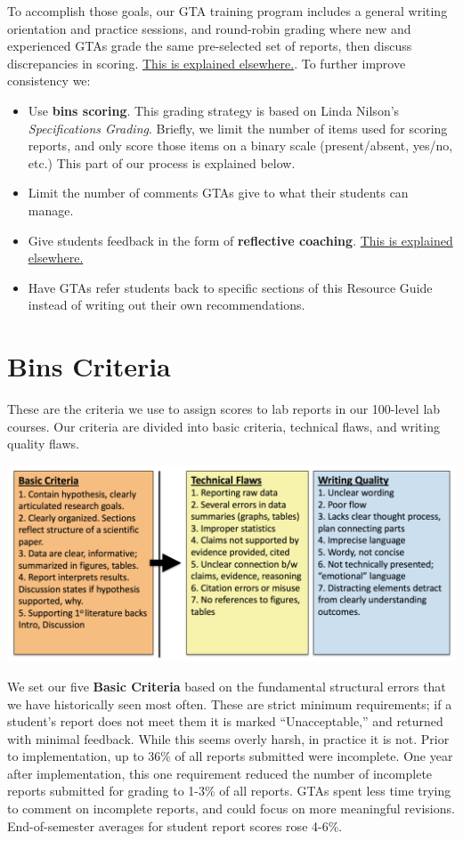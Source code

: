 \documentclass[
]{book}
\providecommand{\tightlist}{%
  \setlength{\itemsep}{0pt}\setlength{\parskip}{0pt}}
\begin{document}
To accomplish those goals, our GTA training program includes a general writing orientation and practice sessions, and round-robin grading where new and experienced GTAs grade the same pre-selected set of reports, then discuss discrepancies in scoring. \protect\hyperlink{commenting710}{This is explained elsewhere.}. To further improve consistency we:

\begin{itemize}
\tightlist
\item
  Use \textbf{bins scoring}. This grading strategy is based on Linda Nilson's \emph{Specifications Grading}. Briefly, we limit the number of items used for scoring reports, and only score those items on a binary scale (present/absent, yes/no, etc.) This part of our process is explained below.
\item
  Limit the number of comments GTAs give to what their students can manage.
\item
  Give students feedback in the form of \textbf{reflective coaching}. \protect\hyperlink{commenting710}{This is explained elsewhere.}
\item
  Have GTAs refer students back to specific sections of this Resource Guide instead of writing out their own recommendations.
\end{itemize}

\hypertarget{bins-criteria}{%
\section{Bins Criteria}\label{bins-criteria}}

These are the criteria we use to assign scores to lab reports in our 100-level lab courses. Our criteria are divided into basic criteria, technical flaws, and writing quality flaws.

\includegraphics{images/Report-criteria.png}

We set our five \textbf{Basic Criteria} based on the fundamental structural errors that we have historically seen most often. These are strict minimum requirements; if a student's report does not meet them it is marked ``Unacceptable,'' and returned with minimal feedback. While this seems overly harsh, in practice it is not. Prior to implementation, up to 36\% of all reports submitted were incomplete. One year after implementation, this one requirement reduced the number of incomplete reports submitted for grading to 1-3\% of all reports. GTAs spent less time trying to comment on incomplete reports, and could focus on more meaningful revisions. End-of-semester averages for student report scores rose 4-6\%.
\end{document}
